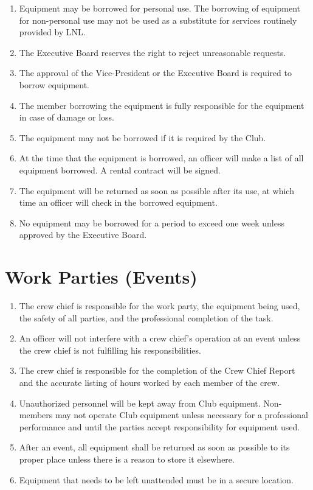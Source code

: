 \documentclass[12pt,letterpaper,oneside]{book}
\begin{document}
\begin{enumerate}

\item Equipment may be borrowed for personal use. The borrowing of equipment for non-personal use may not be used as a substitute for services routinely provided by LNL.
\item The Executive Board reserves the right to reject unreasonable requests.
\item The approval of the Vice-President or the Executive Board is required to borrow equipment.
\item The member borrowing the equipment is fully responsible for the equipment in case of damage or loss.
\item The equipment may not be borrowed if it is required by the Club.
\item At the time that the equipment is borrowed, an officer will make a list of all equipment borrowed. A rental contract will be signed.
\item The equipment will be returned as soon as possible after its use, at which time an officer will check in the borrowed equipment.
\item No equipment may be borrowed for a period to exceed one week unless approved by the Executive Board.

\end{enumerate}

\section{Work Parties (Events)}

\begin{enumerate}

\item The crew chief is responsible for the work party, the equipment being used, the safety of all parties, and the professional completion of the task.
\item An officer will not interfere with a crew chief's operation at an event unless the crew chief is not fulfilling his responsibilities.
\item The crew chief is responsible for the completion of the Crew Chief Report and the accurate listing of hours worked by each member of the crew.
\item Unauthorized personnel will be kept away from Club equipment. Non-members may not operate Club equipment unless necessary for a professional performance and until the parties accept responsibility for equipment used.
\item After an event, all equipment shall be returned as soon as possible to its proper place unless there is a reason to store it elsewhere.
\item Equipment that needs to be left unattended must be in a secure location. 

\end{enumerate}
\end{document}
